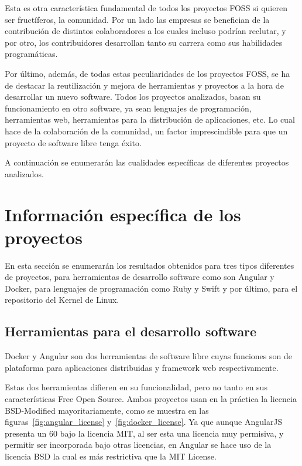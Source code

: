 \documentclass[a4paper, spanish, 12pt]{book}
\begin{document}
Esta es otra caracter\'istica fundamental de todos los proyectos FOSS si quieren ser fruct\'iferos, la comunidad.
Por un lado las empresas se benefician de la contribuci\'on de distintos colaboradores a los cuales incluso
podr\'ian reclutar, y por otro, los contribuidores desarrollan tanto su carrera como sus habilidades program\'aticas.

Por \'ultimo, adem\'as, de todas estas peculiaridades de los proyectos FOSS, se ha de destacar la reutilizaci\'on y
mejora de herramientas y proyectos a la hora de desarrollar un nuevo software. Todos los proyectos analizados,
basan su funcionamiento en otro software, ya sean lenguajes de programaci\'on, herramientas web, herramientas para
la distribuci\'on de aplicaciones, etc. Lo cual hace de la colaboraci\'on de la comunidad, un factor imprescindible
para que un proyecto de software libre tenga \'exito.

A continuaci\'on se enumerar\'an las cualidades espec\'ificas de diferentes proyectos analizados.

\section{Informaci\'on espec\'ifica de los proyectos}
\label{sec:specific_info}

En esta secci\'on se enumerar\'an los resultados obtenidos para tres tipos diferentes de proyectos,
para herramientas de desarrollo software como son Angular y Docker, para lenguajes de programaci\'on como
Ruby y Swift y por \'ultimo, para el repositorio del Kernel de Linux.

\subsection{Herramientas para el desarrollo software}
\label{subsec:software_tools}

Docker y Angular son dos herramientas de software libre cuyas funciones son de plataforma para aplicaciones distribuidas
y framework web respectivamente.

Estas dos herramientas difieren en su funcionalidad, pero no tanto en sus caracter\'isticas Free Open Source.
Ambos proyectos usan en la pr\'actica la licencia BSD-Modified mayoritariamente, como se muestra en las
figuras~\ref{fig:angular_license} y~\ref{fig:docker_license}. Ya que aunque AngularJS presenta un 60%
bajo la licencia MIT, al ser esta una licencia muy permisiva, y permitir ser incorporada bajo otras licencias,
en Angular se hace uso de la licencia BSD la cual es m\'as restrictiva que la MIT License.
\end{document}
